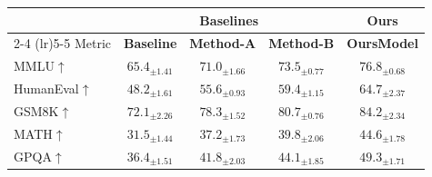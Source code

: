 \documentclass[10pt]{article}
\begin{document}
\centering
\begin{tabular}{l c c c c}
\toprule
 & \multicolumn{3}{c}{Baselines} & \multicolumn{1}{c}{Ours} \\
\cmidrule(lr){2-4} \cmidrule(lr){5-5}
Metric & \textbf{Baseline} & \textbf{Method-A} & \textbf{Method-B} & \textbf{OursModel} \\
\midrule
MMLU$\uparrow$ & $65.4_{\pm 1.41}$ & $71.0_{\pm 1.66}$ & $73.5_{\pm 0.77}$ & \textbf{$76.8_{\pm 0.68}$} \\
HumanEval$\uparrow$ & $48.2_{\pm 1.61}$ & $55.6_{\pm 0.93}$ & $59.4_{\pm 1.15}$ & \textbf{$64.7_{\pm 2.37}$} \\
GSM8K$\uparrow$ & $72.1_{\pm 2.26}$ & $78.3_{\pm 1.52}$ & $80.7_{\pm 0.76}$ & \textbf{$84.2_{\pm 2.34}$} \\
MATH$\uparrow$ & $31.5_{\pm 1.44}$ & $37.2_{\pm 1.73}$ & $39.8_{\pm 2.06}$ & \textbf{$44.6_{\pm 1.78}$} \\
GPQA$\uparrow$ & $36.4_{\pm 1.51}$ & $41.8_{\pm 2.03}$ & $44.1_{\pm 1.85}$ & \textbf{$49.3_{\pm 1.71}$} \\
\bottomrule
\end{tabular}
\end{document}
